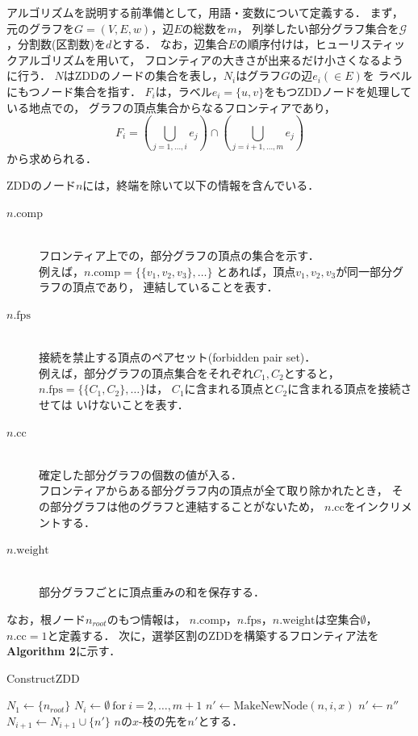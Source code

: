 アルゴリズムを説明する前準備として，用語・変数について定義する．
まず，元のグラフを$G=(V,E,w)$，辺$E$の総数を$m$，
列挙したい部分グラフ集合を$\mathcal{G}$，分割数(区割数)を$d$とする．
なお，辺集合$E$の順序付けは，ヒューリスティックアルゴリズムを用いて，
フロンティアの大きさが出来るだけ小さくなるように行う．
$N$はZDDのノードの集合を表し，$N_i$はグラフ$G$の辺$e_i (\in E)$を
ラベルにもつノード集合を指す．
$F_i$は，ラベル$e_i=\{u,v\}$をもつZDDノードを処理している地点での，
グラフの頂点集合からなるフロンティアであり，
$$ F_i=(\bigcup_{j=1,\ldots ,i}e_j)\cap (\bigcup_{j=i+1, \ldots, m} e_j) $$
から求められる．

ZDDのノード$n$には，終端を除いて以下の情報を含んでいる．

\begin{description}
  \item[$n.\mathrm{comp}$]\mbox{}\\
    フロンティア上での，部分グラフの頂点の集合を示す．\\
    例えば，$n.\mathrm{comp}=\{\{v_1,v_2,v_3\},\ldots\}$
    とあれば，頂点$v_1,v_2,v_3$が同一部分グラフの頂点であり，
    連結していることを表す．
  \item[$n.\mathrm{fps}$ ]\mbox{}\\
    接続を禁止する頂点のペアセット(forbidden pair set)．\\
    例えば，部分グラフの頂点集合をそれぞれ$C_1,C_2$とすると，
    $n.\mathrm{fps}=\{\{C_1,C_2\},\ldots\}$は，
    $C_1$に含まれる頂点と$C_2$に含まれる頂点を接続させては
    いけないことを表す．
  \item[$n.\mathrm{cc}$]\mbox{}\\
    確定した部分グラフの個数の値が入る．\\
    フロンティアからある部分グラフ内の頂点が全て取り除かれたとき，
    その部分グラフは他のグラフと連結することがないため，
    $n.\mathrm{cc}$をインクリメントする．
  \item[$n.\mathrm{weight}$]\mbox{}\\
    部分グラフごとに頂点重みの和を保存する．
\end{description}

なお，根ノード$n_{root}$のもつ情報は，
$n.\mathrm{comp}$，$n.\mathrm{fps}，n.\mathrm{weight}$は空集合$\emptyset$，
$n.\mathrm{cc}=1$と定義する．
次に，選挙区割のZDDを構築するフロンティア法を\textbf{Algorithm 2}に示す．

\begin{algorithm}
  \caption{ConstructZDD}
  \label{construct_zdd}
  \begin{algorithmic}[1]
    \State $N_1 \gets \{n_{root}\}$
    \State $N_i \gets \emptyset~\mathrm{for}~i=2, \ldots ,m+1$
          \State $n' \gets \mathrm{MakeNewNode}(n,i,x)$
              \State $n' \gets n''$
            \Else
              \State $N_{i+1} \gets N_{i+1} \cup \{n'\}$
            \EndIf
          \EndIf
          \State $n$の$x$-枝の先を$n'$とする．
        \EndFor
      \EndFor
    \EndFor
  \end{algorithmic}
\end{algorithm}

